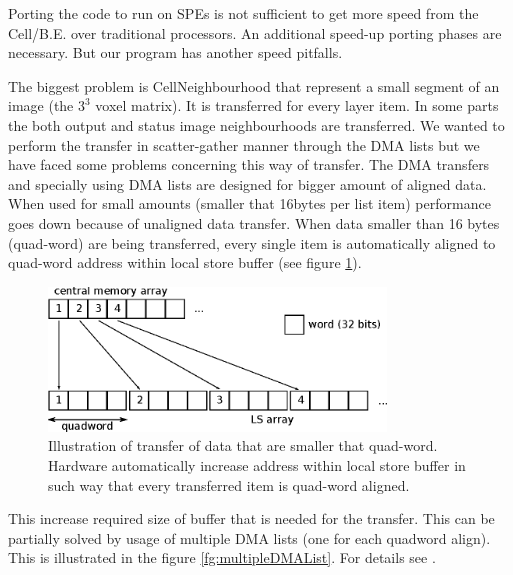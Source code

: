 \par
Porting the code to run on SPEs is not sufficient to get more speed from the Cell/B.E. over traditional processors.
An additional speed-up porting phases are necessary.
But our program has another speed pitfalls.

\par
The biggest problem is CellNeighbourhood that represent a small segment of an image (the $3^3$ voxel matrix).
It is transferred for every layer item.
In some parts the both output and status image neighbourhoods are transferred.
We wanted to perform the transfer in scatter-gather manner through the DMA lists but we have faced some problems concerning this way of transfer.
The DMA transfers and specially using DMA lists are designed for bigger amount of aligned data.
When used for small amounts (smaller that 16bytes per list item) performance goes down because of unaligned data transfer.
When data smaller than 16 bytes (quad-word) are being transferred, every single item is automatically aligned to quad-word address within local store buffer (see figure \ref{fg:automaticAlignOfSmallData}).

\begin{figure}
    \centering
    \includegraphics[width=0.8\textwidth]{data/automaticAlignOfSmallData}
    \caption[Automatic align of small data]
{
  Illustration of transfer of data that are smaller that quad-word.
  Hardware automatically increase address within local store buffer in such way that every transferred item is quad-word aligned.
}
    \label{fg:automaticAlignOfSmallData}
\end{figure}

This increase required size of buffer that is needed for the transfer.
This can be partially solved by usage of multiple DMA lists (one for each quadword align).
This is illustrated in the figure \ref{fg:multipleDMAList}.
For details see \cite{DMAListIssues}.

